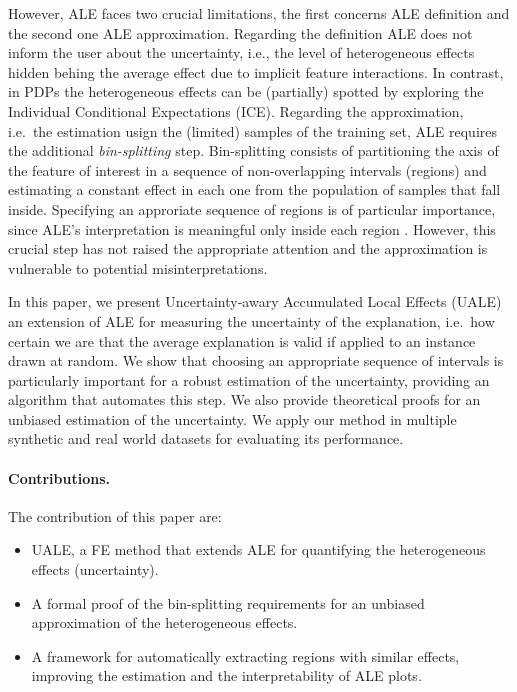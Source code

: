 \documentclass[twoside]{article}
\begin{document}
However, ALE faces two crucial limitations, the first concerns ALE
definition and the second one ALE approximation. Regarding the
definition ALE does not inform the user about the uncertainty, i.e.,
the level of heterogeneous effects hidden behing the average effect
due to implicit feature interactions. In contrast, in PDPs the
heterogeneous effects can be (partially) spotted by exploring the
Individual Conditional Expectations
(ICE)\citep{goldstein2015peeking}. Regarding the approximation,
i.e.~the estimation usign the (limited) samples of the training set,
ALE requires the additional \textit{bin-splitting} step. Bin-splitting
consists of partitioning the axis of the feature of interest in a
sequence of non-overlapping intervals (regions) and estimating a
constant effect in each one from the population of samples that fall
inside. Specifying an approriate sequence of regions is of particular
importance, since ALE's interpretation is meaningful only inside each
region \citep{molnar2022}. However, this crucial step has not raised
the appropriate attention and the approximation is vulnerable to
potential misinterpretations.

In this paper, we present Uncertainty-awary Accumulated Local Effects
(UALE) an extension of ALE for measuring the uncertainty of the
explanation, i.e.~how certain we are that the average explanation is
valid if applied to an instance drawn at random. We show that choosing
an appropriate sequence of intervals is particularly important for a
robust estimation of the uncertainty, providing an algorithm that
automates this step. We also provide theoretical proofs for an
unbiased estimation of the uncertainty. We apply our method in multiple
synthetic and real world datasets for evaluating its performance.

\paragraph{Contributions.} The contribution of this paper are:

\begin{itemize}
\item UALE, a FE method that extends ALE for quantifying the
  heterogeneous effects (uncertainty).
\item A formal proof of the bin-splitting requirements for an unbiased
  approximation of the heterogeneous effects.
\item A framework for automatically extracting regions with similar
  effects, improving the estimation and the interpretability of ALE
  plots.
\end{itemize}
\end{document}
